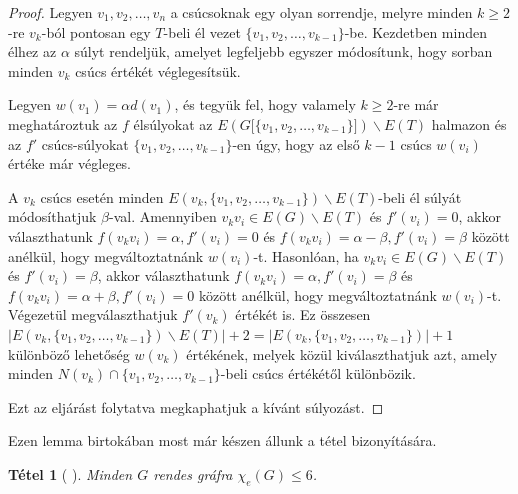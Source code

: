 \documentclass[12pt, a4paper]{report}
\newtheorem{tét}{Tétel}[section]
\theoremstyle{remark}
\theoremstyle{definition}
\begin{document}
\begin{proof}
Legyen $v_1, v_2, \ldots, v_n$ a csúcsoknak egy olyan sorrendje, melyre minden $k \geq 2$-re $v_k$-ból pontosan egy $T$-beli él vezet $\lbrace v_1, v_2, \ldots, v_{k - 1} \rbrace$-be. Kezdetben minden élhez az $\alpha$ súlyt rendeljük, amelyet legfeljebb egyszer módosítunk, hogy sorban minden $v_k$ csúcs értékét véglegesítsük.

Legyen $w(v_1) = \alpha d(v_1)$, és tegyük fel, hogy valamely $k \geq 2$-re már meghatároztuk az $f$ élsúlyokat az $E(G\lbrack \lbrace v_1, v_2, \ldots, v_{k - 1} \rbrace \rbrack) \smallsetminus E(T)$ halmazon és az $f'$ csúcs-súlyokat $\lbrace v_1, v_2, \ldots, v_{k - 1} \rbrace$-en úgy, hogy az első $k - 1$ csúcs $w(v_i)$ értéke már végleges.

A $v_k$ csúcs esetén minden $E(v_k, \lbrace v_1, v_2, \ldots, v_{k - 1} \rbrace) \smallsetminus E(T)$-beli él súlyát módosíthatjuk $\beta$-val. Amennyiben $v_k v_i \in E(G) \smallsetminus E(T)$ és $f'(v_i) = 0$, akkor választhatunk $f(v_k v_i) = \alpha, f'(v_i) = 0$ és $f(v_k v_i) = \alpha - \beta, f'(v_i) = \beta$ között anélkül, hogy megváltoztatnánk $w(v_i)$-t. Hasonlóan, ha $v_k v_i \in E(G) \smallsetminus E(T)$ és $f'(v_i) = \beta$, akkor választhatunk $f(v_k v_i) = \alpha, f'(v_i) = \beta$ és $f(v_k v_i) = \alpha + \beta, f'(v_i) = 0$ között anélkül, hogy megváltoztatnánk $w(v_i)$-t. Végezetül megválaszthatjuk $f'(v_k)$ értékét is. Ez összesen $|E(v_k, \lbrace v_1, v_2, \ldots, v_{k - 1} \rbrace) \smallsetminus E(T)| + 2 = |E(v_k, \lbrace v_1, v_2, \ldots, v_{k - 1} \rbrace)| + 1$ különböző lehetőség $w(v_k)$ értékének, melyek közül kiválaszthatjuk azt, amely minden $N(v_k) \cap \lbrace v_1, v_2, \ldots, v_{k - 1} \rbrace$-beli csúcs értékétől különbözik.

Ezt az eljárást folytatva megkaphatjuk a kívánt súlyozást.
\end{proof}

Ezen lemma birtokában most már készen állunk a tétel bizonyítására.

\begin{tét}[\citeauthor{Kalkowski2009} \cite{Kalkowski2009}]
Minden $G$ rendes gráfra $\chi_e(G) \leq 6$.
\end{tét}
\end{document}
